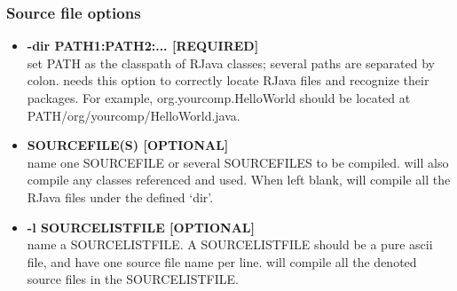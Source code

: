 \documentclass[12pt]{article}
\begin{document}
\subsubsection*{Source file options}
\begin{itemize}
\item
\textbf{-dir PATH1:PATH2:... [REQUIRED] \\}
set PATH as the classpath of RJava classes; several paths are separated by colon. 
\rjc needs this option to correctly locate RJava files and recognize their packages. 
For example, org.yourcomp.HelloWorld should be located at 
PATH/org/yourcomp/HelloWorld.java. 
\item
\textbf{SOURCE\textunderscore FILE(S) [OPTIONAL] \\}
name one SOURCE\textunderscore FILE or several SOURCE\textunderscore FILES
to be compiled. \rjc will also compile any classes referenced and used. 
When left blank, \rjc will compile all the RJava files under the defined `dir'. 
\item
\textbf{-l SOURCE\textunderscore LIST\textunderscore FILE [OPTIONAL] \\}
name a SOURCE\textunderscore LIST\textunderscore FILE. 
A SOURCE\textunderscore LIST\textunderscore FILE should be a pure ascii file, 
and have one source file name per line. \rjc will compile all the denoted source
files in the SOURCE\textunderscore LIST\textunderscore FILE. 

\end{itemize}
\end{document}
